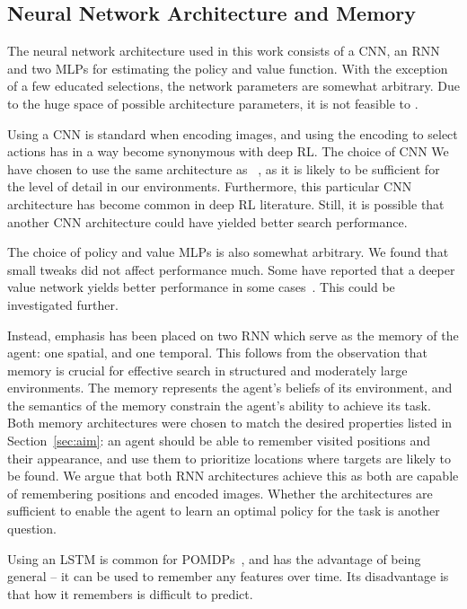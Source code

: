 \subsection{Neural Network Architecture and Memory}

The neural network architecture used in this work consists of a CNN, an RNN and two MLPs for estimating the policy and value function.
With the exception of a few educated selections, the network parameters are somewhat arbitrary.
Due to the huge space of possible architecture parameters, it is not feasible to .

Using a CNN is standard when encoding images, and using the encoding to select actions has in a way become synonymous with deep RL.
The choice of CNN 
We have chosen to use the same architecture as ~\cite{mnih_playing_2013}, as it is likely to be sufficient for the level of detail in our environments.
Furthermore, this particular CNN architecture has become common in deep RL literature.
Still, it is possible that another CNN architecture could have yielded better search performance.

The choice of policy and value MLPs is also somewhat arbitrary.
We found that small tweaks did not affect performance much.
Some have reported that a deeper value network yields better performance in some cases~\cite{andrychowicz_what_2020}.
This could be investigated further.

Instead, emphasis has been placed on two RNN which serve as the memory of the agent: one spatial, and one temporal.
This follows from the observation that memory is crucial for effective search in structured and moderately large environments.
The memory represents the agent's beliefs of its environment, and the semantics of the memory constrain the agent's ability to achieve its task.
Both memory architectures were chosen to match the desired properties listed in Section~\ref{sec:aim}:
an agent should be able to remember visited positions and their appearance, and use them to prioritize locations where targets are likely to be found.
We argue that both RNN architectures achieve this as both are capable of remembering positions and encoded images.
Whether the architectures are sufficient to enable the agent to learn an optimal policy for the task is another question.

Using an LSTM is common for POMDPs~\cite{hausknecht_deep_2017,mnih_asynchronous_2016,mirowski_learning_2017}, and has the advantage of being general --
it can be used to remember any features over time.
Its disadvantage is that how it remembers is difficult to predict.

